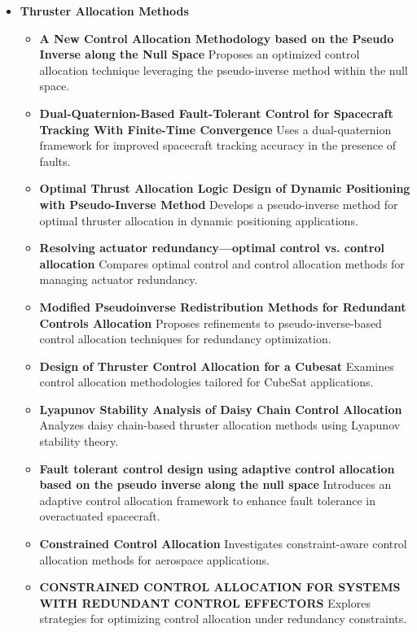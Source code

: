 \begin{itemize}
    \item \textbf{Thruster Allocation Methods}
    \begin{itemize}
        \item \textbf{A New Control Allocation Methodology based on the Pseudo Inverse along the Null Space} \cite{BozorgniaD2013ASpace} Proposes an optimized control allocation technique leveraging the pseudo-inverse method within the null space.
        \item \textbf{Dual-Quaternion-Based Fault-Tolerant Control for Spacecraft Tracking With Finite-Time Convergence} \cite{Dong2017Dual-Quaternion-BasedConvergence} Uses a dual-quaternion framework for improved spacecraft tracking accuracy in the presence of faults.
        \item \textbf{Optimal Thrust Allocation Logic Design of Dynamic Positioning with Pseudo-Inverse Method} \cite{Yang2011OptimalMethod} Develops a pseudo-inverse method for optimal thruster allocation in dynamic positioning applications.
        \item \textbf{Resolving actuator redundancy—optimal control vs. control allocation} \cite{Harkegard2005ResolvingAllocation} Compares optimal control and control allocation methods for managing actuator redundancy.
        \item \textbf{Modified Pseudoinverse Redistribution Methods for Redundant Controls Allocation} \cite{Jin2005ModifiedAllocation} Proposes refinements to pseudo-inverse-based control allocation techniques for redundancy optimization.
        \item \textbf{Design of Thruster Control Allocation for a Cubesat} \cite{ElisaCAPELLOHyeongjunPARK2023POLITECNICOVITA} Examines control allocation methodologies tailored for CubeSat applications.
        \item \textbf{Lyapunov Stability Analysis of Daisy Chain Control Allocation} \cite{Buffington1996LyapunovAllocation} Analyzes daisy chain-based thruster allocation methods using Lyapunov stability theory.
        \item \textbf{Fault tolerant control design using adaptive control allocation based on the pseudo inverse along the null space} \cite{Tohidi2016FaultSpace} Introduces an adaptive control allocation framework to enhance fault tolerance in overactuated spacecraft.
        \item \textbf{Constrained Control Allocation} \cite{Durham1993ConstrainedAllocation} Investigates constraint-aware control allocation methods for aerospace applications.
        \item \textbf{CONSTRAINED CONTROL ALLOCATION FOR SYSTEMS WITH REDUNDANT CONTROL EFFECTORS} \cite{Bordignon1971ConstrainedI} Explores strategies for optimizing control allocation under redundancy constraints.
    \end{itemize}


\end{itemize}
